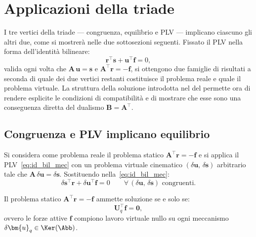 \section{Applicazioni della triade}	\label{sec:applicazioni_triade}

I tre vertici della triade --- congruenza, equilibrio e PLV
--- implicano ciascuno gli altri due, come si mostrerà nelle
due sottosezioni seguenti. Fissato il PLV nella forma
dell'identità bilineare:
\begin{equation}\label{eq:id_bil_mec_app}
	\bm{r}^{\top}\bm{s} + \bm{u}^{\top}\bm{f} = 0,
\end{equation}
valida ogni volta che $\bm{A}\,\bm{u} = \bm{s}$ e
$\bm{A}^{\top}\bm{r} = -\bm{f}$, si ottengono due famiglie
di risultati a seconda di quale dei due vertici restanti
costituisce il problema reale e quale il problema virtuale.
La struttura della soluzione introdotta nel
 del  permette ora di rendere
esplicite le condizioni di compatibilità e di mostrare che esse sono una conseguenza diretta del dualismo
$\bm{B} = \bm{A}^{\top}$.

\subsection{Congruenza e PLV implicano equilibrio}
\label{sec:con_PLV}

Si considera come problema reale il problema statico
$\bm{A}^{\top}\bm{r} = -\bm{f}$ e si applica il
PLV~\eqref{eq:id_bil_mec} con un problema virtuale
cinematico $(\delta\bm{u},\,\delta\bm{s})$ arbitrario
tale che $\bm{A}\,\delta\bm{u} = \delta\bm{s}$.
Sostituendo nella~\eqref{eq:id_bil_mec}:
\begin{equation}\label{eq:id_bil_stat}
	\delta\bm{s}^{\top}\bm{r} +
	\delta\bm{u}^{\top}\bm{f} = 0
	\qquad
	\forall\,(\delta\bm{u},\,\delta\bm{s})
	\text{ congruenti}.
\end{equation}

\begin{corollario}
	\label{cor:compat_stat}
	Il problema statico $\bm{A}^{\top}\bm{r} = -\bm{f}$
	ammette soluzione se e solo se:
	\begin{equation}\label{eq:compat_stat}
		\bm{U}_q^{\top}\bm{f} = \bm{0},
	\end{equation}
	ovvero le forze attive $\bm{f}$ compiono lavoro virtuale
	nullo su ogni meccanismo $\delta\bm{u}_q \in \Ker(\Abb)$.
\end{corollario}

